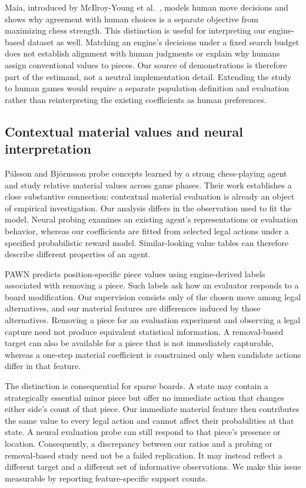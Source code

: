 Maia, introduced by McIlroy-Young et al.\ \cite{maia}, models human move decisions and shows why agreement with human choices is a separate objective from maximizing chess strength. This distinction is useful for interpreting our engine-based dataset as well. Matching an engine's decisions under a fixed search budget does not establish alignment with human judgments or explain why humans assign conventional values to pieces. Our source of demonstrations is therefore part of the estimand, not a neutral implementation detail. Extending the study to human games would require a separate population definition and evaluation rather than reinterpreting the existing coefficients as human preferences.

\subsection{Contextual material values and neural interpretation}
P\'alsson and Bj\"ornsson \cite{palsson} probe concepts learned by a strong chess-playing agent and study relative material values across game phases. Their work establishes a close substantive connection: contextual material evaluation is already an object of empirical investigation. Our analysis differs in the observation used to fit the model. Neural probing examines an existing agent's representations or evaluation behavior, whereas our coefficients are fitted from selected legal actions under a specified probabilistic reward model. Similar-looking value tables can therefore describe different properties of an agent.

PAWN \cite{pawn} predicts position-specific piece values using engine-derived labels associated with removing a piece. Such labels ask how an evaluator responds to a board modification. Our supervision consists only of the chosen move among legal alternatives, and our material features are differences induced by those alternatives. Removing a piece for an evaluation experiment and observing a legal capture need not produce equivalent statistical information. A removal-based target can also be available for a piece that is not immediately capturable, whereas a one-step material coefficient is constrained only when candidate actions differ in that feature.

The distinction is consequential for sparse boards. A state may contain a strategically essential minor piece but offer no immediate action that changes either side's count of that piece. Our immediate material feature then contributes the same value to every legal action and cannot affect their probabilities at that state. A neural evaluation probe can still respond to that piece's presence or location. Consequently, a discrepancy between our ratios and a probing or removal-based study need not be a failed replication. It may instead reflect a different target and a different set of informative observations. We make this issue measurable by reporting feature-specific support counts.

